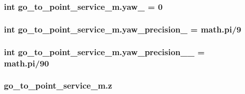 \subsubsection[{\texorpdfstring{yaw\+\_\+}{yaw_}}]{\setlength{\rightskip}{0pt plus 5cm}int go\+\_\+to\+\_\+point\+\_\+service\+\_\+m.\+yaw\+\_\+ = 0}\hypertarget{namespacego__to__point__service__m_ab1e499009bca0d4c9ea5e8954aa37797}{}\label{namespacego__to__point__service__m_ab1e499009bca0d4c9ea5e8954aa37797}
\subsubsection[{\texorpdfstring{yaw\+\_\+precision\+\_\+}{yaw_precision_}}]{\setlength{\rightskip}{0pt plus 5cm}int go\+\_\+to\+\_\+point\+\_\+service\+\_\+m.\+yaw\+\_\+precision\+\_\+ = math.\+pi/9}\hypertarget{namespacego__to__point__service__m_af47f1354626111fc63115c06276ae41d}{}\label{namespacego__to__point__service__m_af47f1354626111fc63115c06276ae41d}
\subsubsection[{\texorpdfstring{yaw\+\_\+precision\+\_\+2\+\_\+}{yaw_precision_2_}}]{\setlength{\rightskip}{0pt plus 5cm}int go\+\_\+to\+\_\+point\+\_\+service\+\_\+m.\+yaw\+\_\+precision\+\_\+\_\+ = math.\+pi/90}\hypertarget{namespacego__to__point__service__m_aa642aefafe9c9c963a86f01c5a256e23}{}\label{namespacego__to__point__service__m_aa642aefafe9c9c963a86f01c5a256e23}
\subsubsection[{\texorpdfstring{z}{z}}]{\setlength{\rightskip}{0pt plus 5cm}go\+\_\+to\+\_\+point\+\_\+service\+\_\+m.\+z}\hypertarget{namespacego__to__point__service__m_aa0ed9dc81f0153863a2a971384dbcba3}{}\label{namespacego__to__point__service__m_aa0ed9dc81f0153863a2a971384dbcba3}
